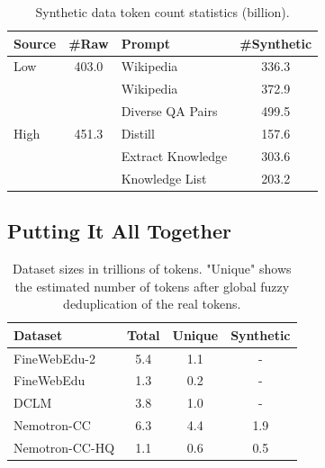 \documentclass[11pt]{article}
\newcommand{\DCLM}{\textsc{DCLM}\xspace}
\newcommand{\Ours}{Nemotron-CC\xspace}
\begin{document}
\begin{table}[!hbt]
    \small
    \centering
    \begin{tabularx}{\linewidth} {l c X c}
    \toprule
    \textbf{Source}      & \textbf{\#Raw}          & \textbf{Prompt}            & \textbf{\#Synthetic} \\
    \midrule
    \textrm{Low}  & 403.0          & \textrm{Wikipedia}      & 336.3 \\
    \midrule
    \multirow{5}{*}{\textrm{High}}  &  \multirow{5}{*}{451.3} & \textrm{Wikipedia}         & 372.9 \\
                         &                         & \textrm{Diverse QA Pairs}  & 499.5 \\
                         &                         & \textrm{Distill}           & 157.6 \\
                         &                         & \textrm{Extract Knowledge} & 303.6 \\
                         &                         & \textrm{Knowledge List}    & 203.2 \\
    \bottomrule
    \end{tabularx}
    \caption{Synthetic data token count statistics (billion).}
    \label{table:synthetic_data_stats}
\end{table}

\subsection{Putting It All Together}

\begin{table}[hbt]\small\centering
\begin{tabularx}{\linewidth}{Xccc}
\toprule
\textbf{Dataset} & \textbf{Total} & \textbf{Unique} & \textbf{Synthetic} \\ \midrule
FineWebEdu-2  & 5.4  & 1.1   & -         \\
FineWebEdu    & 1.3  & 0.2   & -         \\
\DCLM & 3.8  & 1.0     & -         \\
\Ours          & 6.3  & 4.4   & 1.9      \\
\Ours-HQ       & 1.1  & 0.6   & 0.5      \\ \bottomrule
\end{tabularx}
\caption{Dataset sizes in trillions of tokens. "Unique" shows the estimated number of tokens after global fuzzy deduplication of the real tokens.}
\label{table:dataset_sizes}
\end{table}
\end{document}
